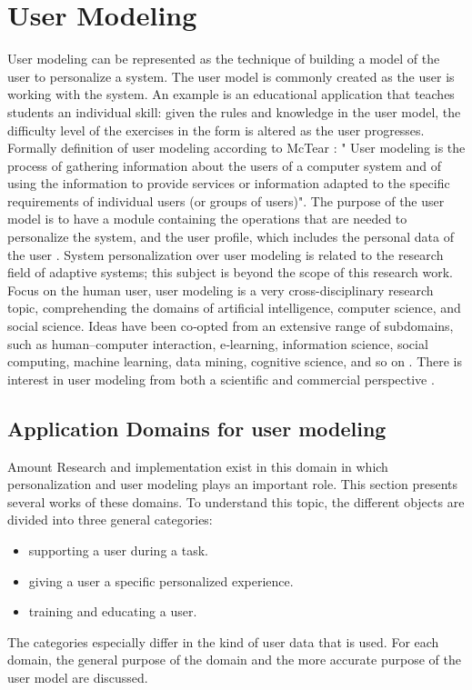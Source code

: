 \section{User Modeling}


User modeling can be represented as the technique of building a model of the
user to personalize a system. The user model is commonly created as the user is
working with the system. An example is an educational application that teaches
students an individual skill: given the rules and knowledge in the user model,
the difficulty level of the exercises in the form is altered as the user
progresses.   Formally definition of user modeling according to McTear
\cite{mctear1993user} : " User modeling is the process of gathering information
about the users of a computer system and of using the information to provide
services or information adapted to the specific requirements of individual users
(or groups of users)". The purpose of the user model is to have a module
containing the operations that are needed to personalize the system, and the
user profile, which includes the personal data of the user
\cite{fischer2001user}. System personalization over user modeling is related
to the research field of adaptive systems; this subject is beyond the scope of
this research work. Focus on the human user, user modeling is a very
cross-disciplinary research topic, comprehending the domains of artificial
intelligence, computer science, and social science. Ideas have been co‐opted
from an extensive range of subdomains, such as human–computer interaction,
e‐learning, information science, social computing, machine learning, data
mining, cognitive science, and so on \cite{kay2012coming}
\cite{kobsa2001generic}. There is interest in user modeling from both a
scientific and commercial perspective \cite{razmerita2009user}.
\subsection{Application Domains for user modeling}

Amount Research and implementation exist in this domain in which personalization
and user modeling plays an important role. This section presents several works
of these domains. To understand this topic, the different objects are divided
into three general categories:
\begin{itemize}
	\item {supporting a user during a task. }
	\item {giving a user a specific personalized experience. }
	\item {training and educating a user.}
\end{itemize}
The categories especially differ in the kind of user data that is used. For each
domain, the general purpose of the domain and the more accurate purpose of the
user model are discussed.

